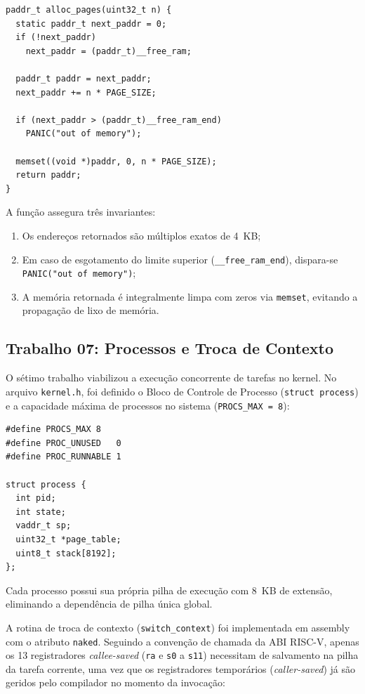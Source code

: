 \documentclass[12pt]{article}
\begin{document}
\begin{verbatim}
paddr_t alloc_pages(uint32_t n) {
  static paddr_t next_paddr = 0;
  if (!next_paddr)
    next_paddr = (paddr_t)__free_ram;

  paddr_t paddr = next_paddr;
  next_paddr += n * PAGE_SIZE;

  if (next_paddr > (paddr_t)__free_ram_end)
    PANIC("out of memory");

  memset((void *)paddr, 0, n * PAGE_SIZE);
  return paddr;
}
\end{verbatim}

A função assegura três invariantes:
\begin{enumerate}
    \item Os endereços retornados são múltiplos exatos de 4~KB;
    \item Em caso de esgotamento do limite superior (\texttt{\_\_free\_ram\_end}), dispara-se \texttt{PANIC("out of memory")};
    \item A memória retornada é integralmente limpa com zeros via \texttt{memset}, evitando a propagação de lixo de memória.
\end{enumerate}

\subsection{Trabalho 07: Processos e Troca de Contexto}

O sétimo trabalho viabilizou a execução concorrente de tarefas no kernel. No arquivo \texttt{kernel.h}, foi definido o Bloco de Controle de Processo (\texttt{struct process}) e a capacidade máxima de processos no sistema (\texttt{PROCS\_MAX = 8}):

\begin{verbatim}
#define PROCS_MAX 8
#define PROC_UNUSED   0
#define PROC_RUNNABLE 1

struct process {
  int pid;
  int state;
  vaddr_t sp;
  uint32_t *page_table;
  uint8_t stack[8192];
};
\end{verbatim}

Cada processo possui sua própria pilha de execução com 8~KB de extensão, eliminando a dependência de pilha única global.

A rotina de troca de contexto (\texttt{switch\_context}) foi implementada em assembly com o atributo \texttt{naked}. Seguindo a convenção de chamada da ABI RISC-V, apenas os 13 registradores \textit{callee-saved} (\texttt{ra} e \texttt{s0} a \texttt{s11}) necessitam de salvamento na pilha da tarefa corrente, uma vez que os registradores temporários (\textit{caller-saved}) já são geridos pelo compilador no momento da invocação:
\end{document}

